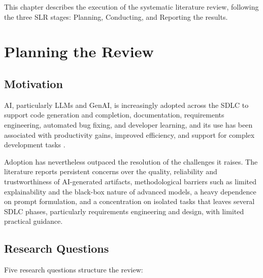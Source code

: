 \label{chap:slr}

This chapter describes the execution of the systematic literature review, following the three SLR stages: Planning, Conducting, and Reporting the results.

\section{Planning the Review}

\subsection{Motivation}

AI, particularly LLMs and GenAI, is increasingly adopted across the SDLC to support code generation and completion, documentation, requirements engineering, automated bug fixing, and developer learning, and its use has been associated with productivity gains, improved efficiency, and support for complex development tasks \cite{Ahmed:2025ai, Zhang:2025ea, Durrani:2024ad, Jabrw:2025ss, Banh:2025cf, Farhanna:2025eu, KarlovsKarlovskis:2024ga, Terragni:2025fa}.

Adoption has nevertheless outpaced the resolution of the challenges it raises. The literature reports persistent concerns over the quality, reliability and trustworthiness of AI-generated artifacts, methodological barriers such as limited explainability and the black-box nature of advanced models, a heavy dependence on prompt formulation, and a concentration on isolated tasks that leaves several SDLC phases, particularly requirements engineering and design, with limited practical guidance.

\subsection{Research Questions}
Five research questions structure the review:

